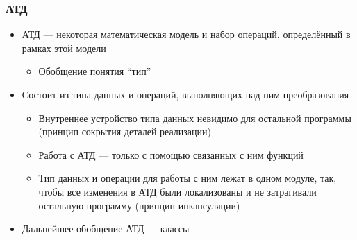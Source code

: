 \documentclass{../../slides-style}
\begin{document}
    
    \begin{frame}[plain]
        \titlepage
    \end{frame}
    
    \begin{frame}
        \frametitle{АТД}
        \begin{itemize}
            \item АТД --- некоторая математическая модель и набор операций, определённый в рамках этой модели
            \begin{itemize}
                \item Обобщение понятия ``тип''
            \end{itemize}
            \item Состоит из типа данных и операций, выполняющих над ним преобразования
            \begin{itemize}
                \item Внутреннее устройство типа данных невидимо для остальной программы (принцип сокрытия деталей реализации)
                \item Работа с АТД --- только с помощью связанных с ним функций
                \item Тип данных и операции для работы с ним лежат в одном модуле, так, чтобы все изменения в АТД были локализованы и не затрагивали остальную программу (принцип инкапсуляции)
            \end{itemize}
            \item Дальнейшее обобщение АТД --- классы
        \end{itemize}
    \end{frame}
\end{document}
